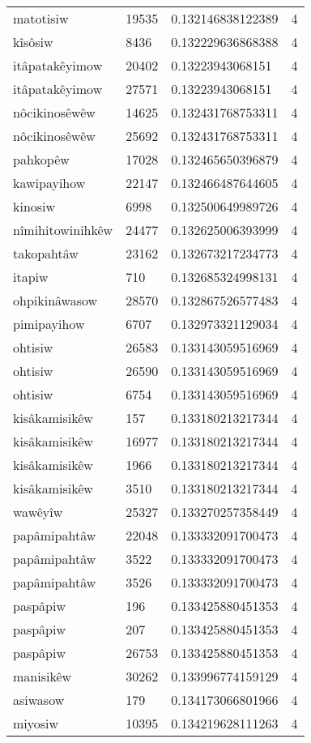 \begin{longtable}{llll}
matotisiw & 19535 & 0.132146838122389 & 4 \\
kîsôsiw & 8436 & 0.132229636868388 & 4 \\
itâpatakêyimow & 20402 & 0.13223943068151 & 4 \\
itâpatakêyimow & 27571 & 0.13223943068151 & 4 \\
nôcikinosêwêw & 14625 & 0.132431768753311 & 4 \\
nôcikinosêwêw & 25692 & 0.132431768753311 & 4 \\
pahkopêw & 17028 & 0.132465650396879 & 4 \\
kawipayihow & 22147 & 0.132466487644605 & 4 \\
kinosiw & 6998 & 0.132500649989726 & 4 \\
nîmihitowinihkêw & 24477 & 0.132625006393999 & 4 \\
takopahtâw & 23162 & 0.132673217234773 & 4 \\
itapiw & 710 & 0.132685324998131 & 4 \\
ohpikinâwasow & 28570 & 0.132867526577483 & 4 \\
pimipayihow & 6707 & 0.132973321129034 & 4 \\
ohtisiw & 26583 & 0.133143059516969 & 4 \\
ohtisiw & 26590 & 0.133143059516969 & 4 \\
ohtisiw & 6754 & 0.133143059516969 & 4 \\
kisâkamisikêw & 157 & 0.133180213217344 & 4 \\
kisâkamisikêw & 16977 & 0.133180213217344 & 4 \\
kisâkamisikêw & 1966 & 0.133180213217344 & 4 \\
kisâkamisikêw & 3510 & 0.133180213217344 & 4 \\
wawêyîw & 25327 & 0.133270257358449 & 4 \\
papâmipahtâw & 22048 & 0.133332091700473 & 4 \\
papâmipahtâw & 3522 & 0.133332091700473 & 4 \\
papâmipahtâw & 3526 & 0.133332091700473 & 4 \\
paspâpiw & 196 & 0.133425880451353 & 4 \\
paspâpiw & 207 & 0.133425880451353 & 4 \\
paspâpiw & 26753 & 0.133425880451353 & 4 \\
manisikêw & 30262 & 0.133996774159129 & 4 \\
asiwasow & 179 & 0.134173066801966 & 4 \\
miyosiw & 10395 & 0.134219628111263 & 4 \\

\end{longtable}
